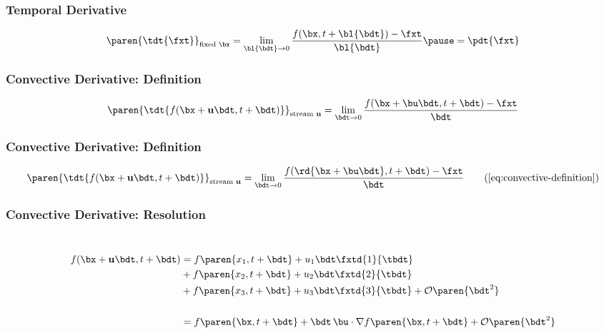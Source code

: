 %
\begin{frame}\frametitle{Temporal Derivative}
\begin{equation}
	\paren{\tdt{\fxt}}_{\text{fixed }\bx} 
		= \lim\limits_{\bl{\bdt} \to 0} \displaystyle\frac{f(\bx, t + \bl{\bdt}) - \fxt} {\bl{\bdt}}
		\pause
		= \pdt{\fxt}
\label{eq:Temporal Derivative}
\end{equation}
\end{frame}
%
%
%
\begin{frame}\frametitle{Convective Derivative: Definition}
\begin{equation}
	\paren{\tdt{f(\bx+ \mathbf{u}\bdt, t+\bdt)}}_{\text{stream }\mathbf{u}} = \lim\limits_{\bdt \to 0} \frac{f(\bx + \bu \bdt, t + \bdt) - \fxt} {\bdt}
\label{eq:convective-definition}
\end{equation}
\end{frame}
%
\begin{frame}\frametitle{Convective Derivative: Definition}
\begin{equation}
	\paren{\tdt{f(\bx+ \mathbf{u}\bdt, t+\bdt)}}_{\text{stream }\mathbf{u}} 
		= \lim\limits_{\bdt \to 0} \frac{f(\rd{\bx + \bu \bdt}, t + \bdt) - \fxt} {\bdt}
\tag{\ref{eq:convective-definition}}
\end{equation}
\end{frame}
%
\begin{frame}\frametitle{Convective Derivative: Resolution}
\center
{}\\
\begin{equation}
\begin{split}
	f(\bx+ \mathbf{u}\bdt, t+\bdt) 
		&= f\paren{x_{1}, t + \bdt} + u_{1}\bdt \fxtd{1}{\tbdt} \\
		&+ f\paren{x_{2}, t + \bdt} + u_{2}\bdt \fxtd{2}{\tbdt} \\
		&+ f\paren{x_{3}, t + \bdt} + u_{3}\bdt \fxtd{3}{\tbdt} + \mathcal{O}\paren{\bdt^{2}}\\[15pt]
		&= f\paren{\bx, t + \bdt} + \bdt\, \bu \cdot \nabla f\paren{\bx, t + \bdt} + \mathcal{O}\paren{\bdt^{2}}
\end{split}
\label{eq:convective-definition-resolution}
\end{equation}
\end{frame}
